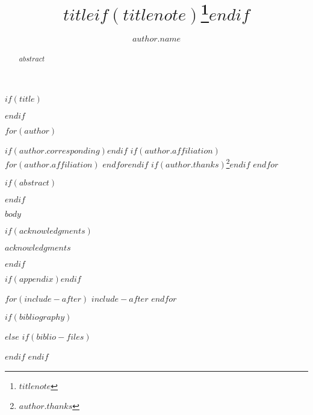 \documentclass[$for(classoption)$$classoption$$sep$,$endfor$]{$documentclass$}
\begin{document}
$if(title)$
\title[$if(runningtitle)$$runningtitle$$endif$]{$title$$if(titlenote)$\thanks{$titlenote$}$endif$}
$endif$

$for(author)$
\author{$author.name$}
$if(author.corresponding)$$endif$
$if(author.affiliation)$
$for(author.affiliation)$
$endfor$$endif$
$if(author.thanks)$\thanks{$author.thanks$}$endif$
$endfor$



$if(abstract)$
\begin{abstract}
$abstract$
\end{abstract}
$endif$

\maketitle

$body$

$if(acknowledgments)$\begin{acknowledgments}$acknowledgments$\end{acknowledgments}$endif$

$if(appendix)$$endif$

$for(include-after)$
$include-after$
$endfor$


$if(bibliography)$

$else$
$if(biblio-files)$

$endif$
$endif$
\end{document}
